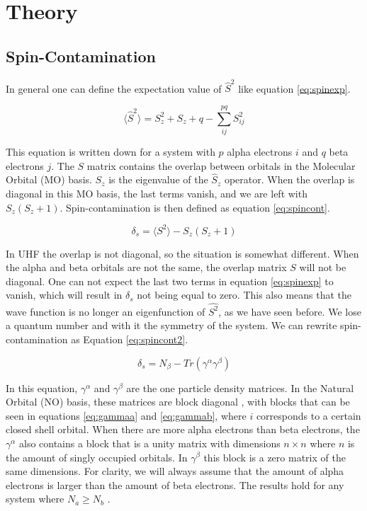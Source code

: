\documentclass[twoside,twocolumn,9pt]{article}
\begin{document}
\section{Theory}
\subsection{Spin-Contamination}
\label{subsec:spinconttheory}
In general one can define the expectation value of $\hat{S}^2$ like equation \eqref{eq:spinexp}\cite{Andrews1991}.

\begin{equation}\label{eq:spinexp}
  \langle \hat{S}^2 \rangle = S_z^2 + S_z + q - \sum_{ij}^{pq} S_{ij}^2
\end{equation}

This equation is written down for a system with $p$ alpha electrons $i$ and $q$ beta electrons $j$. The $S$ matrix contains the overlap between orbitals in the Molecular Orbital (MO)
basis. $S_z$ is the eigenvalue of the $\hat{S}_z$ operator. When the overlap is diagonal in this MO basis, the last terms vanish, and we are left with $S_z(S_z + 1)$.
Spin-contamination is then defined as equation \eqref{eq:spincont}.

\begin{equation}\label{eq:spincont}
  \delta_s = \langle S^2 \rangle - S_z(S_z + 1)
\end{equation}

In UHF the overlap is not diagonal, so the situation is somewhat different. When the alpha and beta orbitals are not the same, the overlap matrix $S$ will not be diagonal. One can not
expect the last two terms in equation \eqref{eq:spinexp} to vanish, which will result in $\delta_s$ not being equal to zero. This also means that the wave function is no longer an
eigenfunction of $\hat{S^2}$, as we have seen before. We lose a quantum number and with it the symmetry of the system. We can rewrite spin-contamination as Equation
\eqref{eq:spincont2}\cite{Savin2010}.

\begin{equation}\label{eq:spincont2}
  \delta_s = N_\beta - Tr(\gamma^\alpha\gamma^\beta)
\end{equation}

In this equation, $\gamma^{\alpha}$ and $\gamma^\beta$ are the one particle density matrices. In the Natural Orbital (NO) basis, these matrices are block diagonal
\cite{Scuseria2010}, with blocks that can be seen in equations \eqref{eq:gammaa} and \eqref{eq:gammab}, where $i$ corresponds to a certain closed shell orbital. When there are more
alpha electrons than beta electrons,
the $\gamma^\alpha$ also contains a block that is a unity matrix with dimensions $n\times n$ where $n$ is the amount of singly occupied orbitals. In $\gamma^\beta$ this block is a
zero matrix of the same dimensions. For clarity, we will always assume that the amount of alpha electrons is larger than the amount of beta electrons. The results hold for any system
where $N_a \geq N_b $ \cite{Scuseria2010}.
\end{document}
